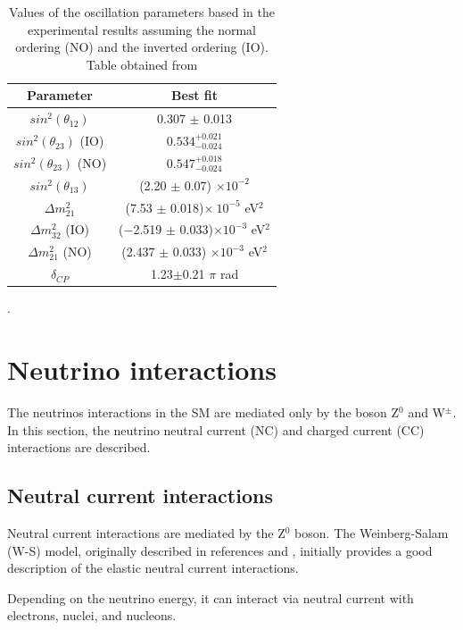 \begin{table}[!htb]
    \centering
    \begin{tabular}{c|c}
        Parameter & Best fit \\ \hline
        $sin^2(\theta_{12})$ & 0.307 $\pm$ 0.013 \\ \hline
        $sin^2(\theta_{23})$ (IO) & $0.534^{+0.021}_{-0.024}$ \\ \hline
        $sin^2(\theta_{23})$ (NO) & $0.547^{+0.018}_{-0.024}$  \\ \hline
        $sin^2(\theta_{13})$ & (2.20 $\pm$ 0.07) $\times10^{−2}$ \\ \hline
        $\Delta m^2_{21}$ & (7.53 $\pm$ 0.018)$ \times\ 10^{-5}$ eV$^2$ \\ \hline
        $\Delta m^2_{32}$ (IO) &  (−2.519 $\pm$ 0.033)$\times10^{−3}$ eV$^2$ \\ \hline
        $\Delta m^2_{21}$ (NO) & (2.437 $\pm$ 0.033) $\times10^{−3}$ eV$^2$ \\ \hline
        $\delta_{CP}$ & 1.23$\pm$0.21 $\pi$ rad\\
    \end{tabular}
    \caption{Values of the oscillation parameters based in the experimental results assuming the normal ordering (NO) and the inverted ordering (IO). Table obtained from \cite{Workman:2022ynf}}.
    \label{tab:Cap1:OscillationParameters}
\end{table}

\section{Neutrino interactions}
\label{Cap:Int:NuInteractions}

The neutrinos interactions in the SM are mediated only by the boson Z$^0$ and W$^{\pm}$. In this section, the neutrino neutral current (NC) and charged current (CC) interactions are described.

\subsection{Neutral current interactions}
\label{Cap:Int:NuInteractions:NC}

Neutral current interactions are mediated by the Z$^0$ boson. The Weinberg-Salam (W-S) model, originally described in references \cite{PhysRevLett.19.1264} and \cite{Salam1959}, initially provides a good description of the elastic neutral current interactions.

Depending on the neutrino energy, it can interact via neutral current with electrons, nuclei, and nucleons.

